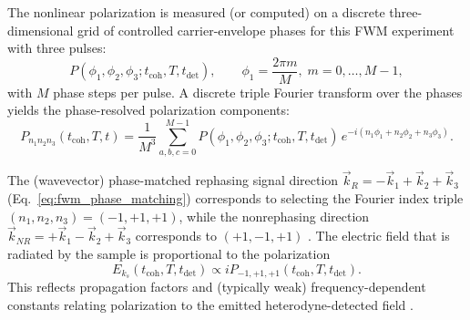\noindent The nonlinear polarization is measured (or computed) on a discrete three-dimensional grid of controlled carrier-envelope phases for this FWM experiment with three pulses:
\begin{equation}
	P(\phi_{1}, \phi_{2}, \phi_{3}; t_{\text{coh}}, T, t_{\text{det}}), \qquad
	\phi_{1} = \frac{2\pi m}{M}, \; m=0,\dots,M-1,
	\label{eq:phase_grid_definition}
\end{equation}
with $M$ phase steps per pulse. A discrete triple Fourier transform over the phases yields the phase-resolved polarization components:
\begin{equation}
	P_{n_1 n_2 n_3}(t_{\text{coh}}, T, t)
	=
	\frac{1}{M^{3}}
	\sum_{a,b,c=0}^{M-1}
	P(\phi_{1}, \phi_{2}, \phi_{3}; t_{\text{coh}}, T, t_{\text{det}})\,
	e^{-i ( n_1 \phi_{1} + n_2 \phi_{2} + n_3 \phi_{3} )}.
	\label{eq:dft_phase_cycling}
\end{equation}

\noindent The (wavevector) phase-matched rephasing signal direction $\vec{k}_R = -\vec{k}_1 + \vec{k}_2 + \vec{k}_3$ (Eq.~\eqref{eq:fwm_phase_matching}) corresponds to selecting the Fourier index triple $(n_1,n_2,n_3)=(-1,+1,+1)$, while the nonrephasing direction $\vec{k}_{NR} = +\vec{k}_1 - \vec{k}_2 + \vec{k}_3$ corresponds to $(+1,-1,+1)$ \cite{mukamel1995principlesnonlinearoptical, cho2009twodimensionalopticalspectroscopy, greenetal2024vibrationalcoherenceshalfbroadband}. The electric field that is radiated by the sample is proportional to the polarization
\begin{equation}
	E_{k_s}(t_{\text{coh}}, T, t_{\text{det}}) \propto i P_{-1,+1,+1}(t_{\text{coh}}, T, t_{\text{det}}).
\end{equation}
This reflects propagation factors and (typically weak) frequency-dependent constants relating polarization to the emitted heterodyne-detected field \cite{mukamel1995principlesnonlinearoptical, greenetal2024vibrationalcoherenceshalfbroadband}.

